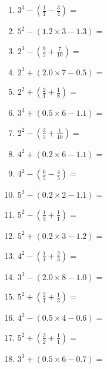 \documentclass[12pt]{article}
\begin{document}
\begin{enumerate}
\item \large $ 3^{3} - (\frac{1}{1} - \frac{3}{4}) = $ \vspace{1.6cm}
\item \large $ 5^{2} - (1.2 \times 3 - 1.3) = $ \vspace{1.6cm}
\item \large $ 2^{3} - (\frac{9}{5} + \frac{7}{10}) = $ \vspace{1.6cm}
\item \large $ 2^{3} + (2.0 \times 7 - 0.5) = $ \vspace{1.6cm}
\newpage
\item \large $ 2^{2} + (\frac{2}{1} + \frac{1}{8}) = $ \vspace{1.6cm}
\item \large $ 3^{3} + (0.5 \times 6 - 1.1) = $ \vspace{1.6cm}
\item \large $ 2^{2} - (\frac{3}{5} + \frac{1}{10}) = $ \vspace{1.6cm}
\item \large $ 4^{2} + (0.2 \times 6 - 1.1) = $ \vspace{1.6cm}
\item \large $ 4^{2} - (\frac{6}{5} - \frac{4}{5}) = $ \vspace{1.6cm}
\item \large $ 5^{2} - (0.2 \times 2 - 1.1) = $ \vspace{1.6cm}
\item \large $ 5^{2} - (\frac{1}{3} + \frac{1}{1}) = $ \vspace{1.6cm}
\item \large $ 5^{2} + (0.2 \times 3 - 1.2) = $ \vspace{1.6cm}
\item \large $ 4^{2} - (\frac{1}{1} + \frac{2}{3}) = $ \vspace{1.6cm}
\item \large $ 3^{3} - (2.0 \times 8 - 1.0) = $ \vspace{1.6cm}
\newpage
\item \large $ 5^{2} + (\frac{2}{1} + \frac{1}{3}) = $ \vspace{1.6cm}
\item \large $ 4^{2} - (0.5 \times 4 - 0.6) = $ \vspace{1.6cm}
\item \large $ 5^{2} + (\frac{3}{2} + \frac{1}{1}) = $ \vspace{1.6cm}
\item \large $ 3^{3} + (0.5 \times 6 - 0.7) = $ \vspace{1.6cm}

\end{enumerate}
\end{document}
